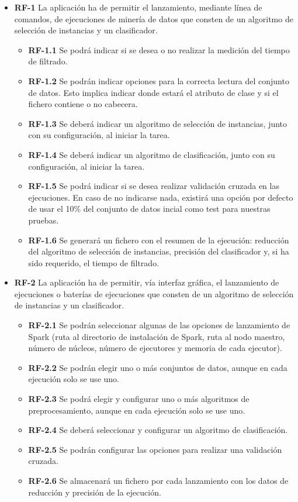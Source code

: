 \begin{itemize}

\item \textbf{RF-1} La aplicación ha de permitir el lanzamiento, mediante línea de comandos, de ejecuciones de minería de datos que consten de un algoritmo de selección de instancias y un clasificador.
	\begin{itemize}
		\item \textbf{RF-1.1} Se podrá indicar si se desea o no realizar la medición del tiempo de filtrado.
		\item \textbf{RF-1.2} Se podrán indicar opciones para la correcta lectura del conjunto de datos. Esto implica indicar donde estará el atributo de clase y si el fichero contiene o no cabecera.
		\item \textbf{RF-1.3} Se deberá indicar un algoritmo de selección de instancias, junto con su configuración, al iniciar la tarea.
		\item \textbf{RF-1.4} Se deberá indicar un algoritmo de clasificación, junto con su configuración, al iniciar la tarea.
		\item \textbf{RF-1.5} Se podrá indicar si se desea realizar validación cruzada en las ejecuciones. En caso de no indicarse nada, existirá una opción por defecto de usar el 10\% del conjunto de datos incial como test para nuestras pruebas.
		\item \textbf{RF-1.6} Se generará un fichero con el resumen de la ejecución: reducción del algoritmo de selección de instancias, precisión del clasificador y, si ha sido requerido, el tiempo de filtrado.
	\end{itemize}

\item \textbf{RF-2} La aplicación ha de permitir, vía interfaz gráfica, el lanzamiento de ejecuciones o baterías de ejecuciones que consten de un algoritmo de selección de instancias y un clasificador.
	\begin{itemize}
		\item \textbf{RF-2.1} Se podrán seleccionar algunas de las opciones de lanzamiento de Spark (ruta al directorio de instalación de Spark, ruta al nodo maestro, número de núcleos, número de ejecutores y memoria de cada ejecutor).
		\item \textbf{RF-2.2} Se podrán elegir uno o más conjuntos de datos, aunque en cada ejecución solo se use uno.
		\item \textbf{RF-2.3} Se podrá elegir y configurar uno o más algoritmos de preprocesamiento, aunque en cada ejecución solo se use uno.
		\item \textbf{RF-2.4} Se deberá seleccionar y configurar un algoritmo de clasificación.
		\item \textbf{RF-2.5} Se podrán configurar las opciones para realizar una validación cruzada.
		\item \textbf{RF-2.6} Se almacenará un fichero por cada lanzamiento con los datos de reducción y precisión de la ejecución.
	\end{itemize}


\end{itemize}
